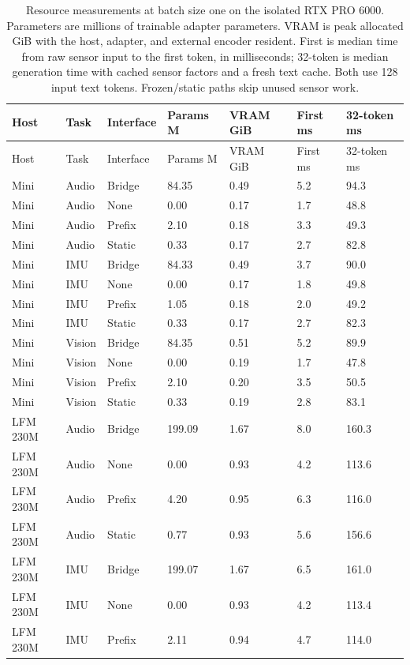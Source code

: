 {\small
\setlength{\tabcolsep}{4pt}
\begin{longtable}{@{}lllllll@{}}
\caption{Resource measurements at batch size one on the isolated RTX PRO 6000. Parameters are millions of trainable adapter parameters. VRAM is peak allocated GiB with the host, adapter, and external encoder resident. First is median time from raw sensor input to the first token, in milliseconds; 32-token is median generation time with cached sensor factors and a fresh text cache. Both use 128 input text tokens. Frozen/static paths skip unused sensor work.}\label{tab:resources-full}\\
\toprule
Host & Task & Interface & Params M & VRAM GiB & First ms & 32-token ms \\
\midrule\endfirsthead
\toprule
Host & Task & Interface & Params M & VRAM GiB & First ms & 32-token ms \\
\midrule\endhead
Mini & Audio & Bridge & 84.35 & 0.49 & 5.2 & 94.3 \\
Mini & Audio & None & 0.00 & 0.17 & 1.7 & 48.8 \\
Mini & Audio & Prefix & 2.10 & 0.18 & 3.3 & 49.3 \\
Mini & Audio & Static & 0.33 & 0.17 & 2.7 & 82.8 \\
Mini & IMU & Bridge & 84.33 & 0.49 & 3.7 & 90.0 \\
Mini & IMU & None & 0.00 & 0.17 & 1.8 & 49.8 \\
Mini & IMU & Prefix & 1.05 & 0.18 & 2.0 & 49.2 \\
Mini & IMU & Static & 0.33 & 0.17 & 2.7 & 82.3 \\
Mini & Vision & Bridge & 84.35 & 0.51 & 5.2 & 89.9 \\
Mini & Vision & None & 0.00 & 0.19 & 1.7 & 47.8 \\
Mini & Vision & Prefix & 2.10 & 0.20 & 3.5 & 50.5 \\
Mini & Vision & Static & 0.33 & 0.19 & 2.8 & 83.1 \\
LFM 230M & Audio & Bridge & 199.09 & 1.67 & 8.0 & 160.3 \\
LFM 230M & Audio & None & 0.00 & 0.93 & 4.2 & 113.6 \\
LFM 230M & Audio & Prefix & 4.20 & 0.95 & 6.3 & 116.0 \\
LFM 230M & Audio & Static & 0.77 & 0.93 & 5.6 & 156.6 \\
LFM 230M & IMU & Bridge & 199.07 & 1.67 & 6.5 & 161.0 \\
LFM 230M & IMU & None & 0.00 & 0.93 & 4.2 & 113.4 \\
LFM 230M & IMU & Prefix & 2.11 & 0.94 & 4.7 & 114.0 \\

\end{longtable}}
